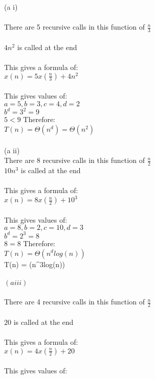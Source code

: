 \documentclass{article}
\begin{document}
\begin{solution}

\\\\(a i)
\\\\ There are 5 recursive calls in this function of $\frac{n}{3}$
\\\\ $4n^2$ is called at the end
\\\\ This gives a formula of:
\\ $x(n) = 5x(\frac{n}{3})+4n^2$
\\\\ This gives values of:
\\ $a=5, b=3, c=4, d=2$
\\ $b^d = 3^2=9$
\\ $5 < 9$ Therefore:
\\ $T(n) = \Theta(n^d) = \Theta(n^2)$
\newline
\\\\(a ii)
\\ There are 8 recursive calls in this function of $\frac{n}{2}$
\\ $10n^3$ is called at the end
\\\\ This gives a formula of:
\\ $x(n) = 8x(\frac{n}{2})+10^3$
\\\\ This gives values of:
\\ $a=8, b=2, c=10, d=3$
\\ $b^d = 2^3 = 8$
\\ $8=8$ Therefore:
\\ $T(n) = \Theta(n^dlog(n))$
\\ T(n) = \Theta(n^3log(n))
\newline
\\\\ $(a iii)$
\\\\ There are 4 recursive calls in this function of $\frac{n}{2}$
\\\\ $20$ is called at the end
\\\\ This gives a formula of:
\\ $x(n) = 4x(\frac{n}{2})+20$
\\\\ This gives values of:

\end{solution}
\end{document}
